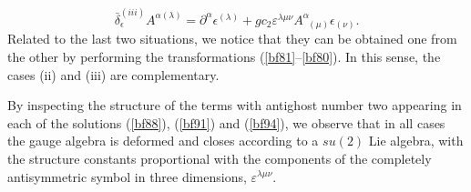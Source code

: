 \documentclass[a4paper,11pt]{article}
\begin{document}
\begin{equation}
\bar{\delta}_{\epsilon }^{(iii)}A^{\alpha (\lambda )}=\partial ^{\alpha
}\epsilon ^{(\lambda )}+gc_{2}\varepsilon ^{\lambda \mu \nu }A_{\;\;(\mu
)}^{\alpha }\epsilon _{(\nu )}.  \label{bf103}
\end{equation}
Related to the last two situations, we notice that they can be obtained one
from the other by performing the transformations (\ref{bf81}--\ref{bf80}).
In this sense, the cases (ii) and (iii) are complementary.

By inspecting the structure of the terms with antighost number two appearing
in each of the solutions (\ref{bf88}), (\ref{bf91}) and (\ref{bf94}), we
observe that in all cases the gauge algebra is deformed and closes according
to a $su(2)$ Lie algebra, with the structure constants proportional with the
components of the completely antisymmetric symbol in three dimensions, $%
\varepsilon ^{\lambda \mu \nu }$.
\end{document}
